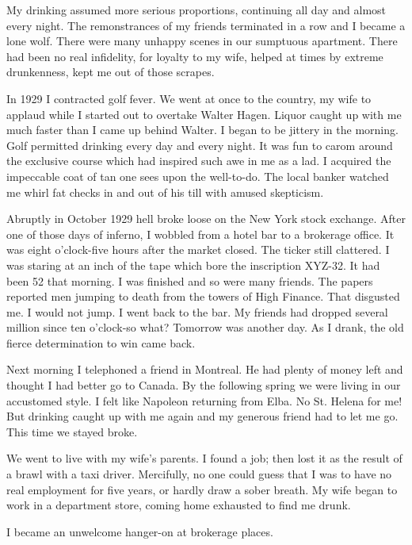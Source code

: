\begin{biblechapter}
    My drinking assumed more serious proportions, 
    continuing all day and almost every night.
\verse The remonstrances of my friends terminated in a row and I became a lone wolf.
\verse There were many unhappy scenes in our sumptuous apartment.
\verse There had been no real infidelity, 
    for loyalty to my wife, 
    helped at times by extreme drunkenness, 
    kept me out of those scrapes.

\verse In 1929 I contracted golf fever.
\verse We went at once to the country, 
    my wife to applaud while I started out to overtake Walter Hagen.
\verse Liquor caught up with me much faster than I came up behind Walter.
\verse I began to be jittery in the morning.
\verse Golf permitted drinking every day and every night.
\verse It was fun to carom around the exclusive course 
    which had inspired such awe in me as a lad.
\verse I acquired the impeccable coat of tan one sees upon the well-to-do.
\verse The local banker watched me whirl fat checks in and out of his till with amused skepticism.

\verse Abruptly in October 1929 hell broke loose on the New York stock exchange.
\verse After one of those days of inferno, 
    I wobbled from a hotel bar to a brokerage office.
\verse It was eight o'clock-five hours after the market closed.
\verse The ticker still clattered.
\verse I was staring at an inch of the tape which bore the inscription XYZ-32.
\verse It had been 52 that morning.
\verse I was finished and so were many friends.
\verse The papers reported men jumping to death from the towers of High Finance.
\verse That disgusted me.
\verse I would not jump.
\verse I went back to the bar.
\verse My friends had dropped several million since ten o'clock-so what?
\verse Tomorrow was another day.
\verse As I drank, the old fierce determination to win came back.

\verse Next morning I telephoned a friend in Montreal.
\verse He had plenty of money left and thought I had better go to Canada.
\verse By the following spring we were living in our accustomed style.
\verse I felt like Napoleon returning from Elba.
\verse No St. Helena for me!
\verse But drinking caught up with me again and my generous friend had to let me go.
\verse This time we stayed broke.

\verse We went to live with my wife's parents.
\verse I found a job; 
    then lost it as the result of a brawl with a taxi driver.
\verse Mercifully, no one could guess that I was to have no real employment for five years, 
    or hardly draw a sober breath.
\verse My wife began to work in a department store, 
    coming home exhausted to find me drunk.

\verse I became an unwelcome hanger-on at brokerage places.
\end{biblechapter}


